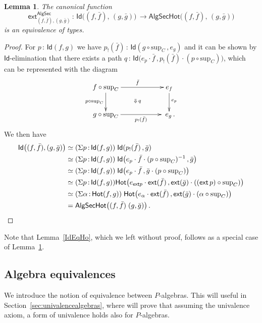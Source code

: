\documentclass[10pt,a4paper,oneside,reqno]{amsart}
\numberwithin{equation}{section}
\theoremstyle{mythm}
\newtheorem{lemma}[theorem]{Lemma}
\theoremstyle{mydef}
\theoremstyle{myrmk}
\newcommand{\co}{\,{:}\,}
\newcommand{\ct}{\cdot}
\newcommand{\Hot}{\mathsf{Hot}}
\newcommand{\ext}{\mathsf{ext}}
\newcommand{\Id}{\mathsf{Id}}
\renewcommand{\sup}{\mathrm{sup}}
\newcommand{\PalgSec}{\mathsf{AlgSec}}
\newcommand{\AlgSecHot}{\mathsf{AlgSecHot}}
\begin{document}
\begin{lemma}\label{lem:fibhomeqid} The canonical function
\[
\ext^\PalgSec_{(f, \bar{f}), (g, \bar{g})} \co \Id \big( (f, \bar{f}) ,\, (g, \bar{g}) \big) \, \to
\AlgSecHot\big( (f, \bar{f}) ,\, (g, \bar{g}) \big) 
\]
is an equivalence of types.
\end{lemma}

\begin{proof} For $p \co \Id(f, g)$ we have  $p_{!}(\bar{f}) \co  \Id( g \circ \sup_C \, , e_g)$ 
and it can be shown by $\Id$-elimination that there exists a path 
$q  \co \Id\big(  e_p \ct \bar{f}   \, ,  p_{!}(\bar{f})  \ct  (p \circ \sup_C)    \big)$, 
which can be represented with the diagram
\[
\xymatrix@C=2cm{
f \circ \sup_C  \ar[d]_-{p \circ \sup_C}  \ar[r]^{\bar{f}}  \ar@{}[dr]|{\Downarrow \, q } & e_f 
\ar[d]^{ e_p}  \\
 g \circ \sup_C \ar[r]_-{ p_{!}(\bar{f}) }  & \; e_g \, .    }
\]
We then have
\begin{align*}
  \Id\big( (f,\bar{f}),  (g,\bar{g}) \big) 
& \simeq (\Sigma p \co \Id( f , g)) \; \Id ( p_{!} ( \bar{f} ) \, , \bar{g}  )  \\
& \simeq (\Sigma p \co \Id( f, g)) 
\; \Id\big(  
e_p \ct  \bar{f} \ct (p \circ \sup_C)^{-1} \, , \bar{g}     \big)   \\ 
& \simeq (\Sigma p \co \Id( f, g)) 
\; \Id\big( e_p  \ct \bar{f} \, ,   \bar{g} \ct ( p \circ \sup_C)   \big)   \\ 
& \simeq (\Sigma p \co \Id( f, g)) 
\Hot\big(  e_{\ext p} \ct \ext( \bar{f}) \, , 
 \ext( \bar{g}) \ct ( (\ext \, p) \circ \sup_C)   \big)  \\ 
&  \simeq (\Sigma \alpha \co \Hot( f, g)) \; 
\Hot\big(  e_\alpha \ct \ext( \bar{f}) \, , 
 \ext( \bar{g}) \ct (\alpha \circ \sup_C)   \big)  \\
&  =   \AlgSecHot \big( (f,\bar{f}) \; (g,\bar{g}) \big) \, . \qedhere
\end{align*}  
\end{proof}

Note that Lemma~\ref{IdEqHo}, which we left without proof, follows as a special case of Lemma~\ref{lem:fibhomeqid}. 

\subsection*{Algebra equivalences}  We introduce the notion of equivalence between $P$-algebras. This
will useful in Section~\ref{sec:univalencealgebras}, where will prove that assuming the univalence axiom, a form of univalence holds also for $P$-algebras. 
\end{document}

